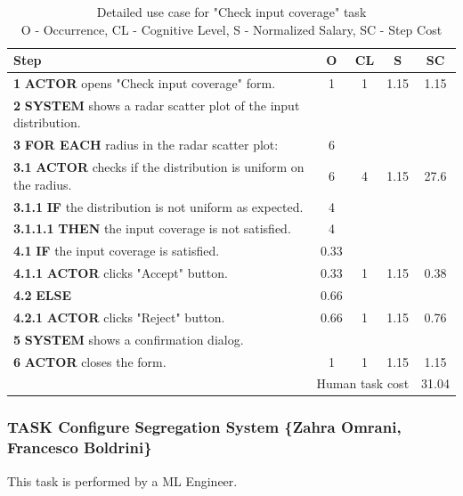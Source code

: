 \begin{table}[H]
\centering
\begin{tabularx}{\textwidth}{|X|c|c|c|c|}
\hline
\textbf{Step} & \textbf{O} & \textbf{CL} & \textbf{S} & \textbf{SC} \\
\hline
\textbf{1} \textbf{ACTOR} opens "Check input coverage" form. & 1 & 1 & 1.15 & 1.15 \\
\hline
\textbf{2} \textbf{SYSTEM} shows a radar scatter plot of the input distribution. & & & & \\
\hline
\textbf{3} \textbf{FOR EACH} radius in the radar scatter plot: & 6 & & & \\
\hline
\textbf{3.1} \textbf{ACTOR} checks if the distribution is uniform on the radius. & 6 & 4 & 1.15 & 27.6 \\
\hline
\textbf{3.1.1} \textbf{IF} the distribution is not uniform as expected. & 4 & & & \\
\hline
\textbf{3.1.1.1} \textbf{THEN} the input coverage is not satisfied. & 4 & & & \\
\hline
\textbf{4.1} \textbf{IF} the input coverage is satisfied. & 0.33 & & & \\
\hline
\textbf{4.1.1} \textbf{ACTOR} clicks "Accept" button. & 0.33 & 1 & 1.15 & 0.38 \\
\hline
\textbf{4.2} \textbf{ELSE} & 0.66 & & & \\
\hline
\textbf{4.2.1} \textbf{ACTOR} clicks "Reject" button. & 0.66 & 1 & 1.15 & 0.76 \\
\hline
\textbf{5} \textbf{SYSTEM} shows a confirmation dialog. & & & & \\
\hline
\textbf{6} \textbf{ACTOR} closes the form. & 1 & 1 & 1.15 & 1.15 \\
\hline
\multicolumn{4}{|r|}{Human task cost} & 31.04 \\
\hline
\end{tabularx}
\caption{Detailed use case for "Check input coverage" task\\ 
O - Occurrence, CL - Cognitive Level, S - Normalized Salary, SC - Step Cost}
\label{table:check_input_coverage}
\end{table}

\subsubsection{TASK Configure Segregation System \{Zahra Omrani, Francesco Boldrini\}}
This task is performed by a ML Engineer.

